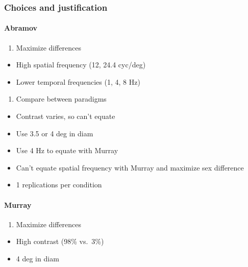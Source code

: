 \documentclass[]{article}
\providecommand{\tightlist}{%
  \setlength{\itemsep}{0pt}\setlength{\parskip}{0pt}}
\let\oldparagraph\paragraph
\renewcommand{\paragraph}[1]{\oldparagraph{#1}\mbox{}}
\begin{document}
\subsubsection{Choices and
justification}\label{choices-and-justification}

\paragraph{Abramov}\label{abramov}

\begin{enumerate}
\def\labelenumi{\arabic{enumi}.}
\tightlist
\item
  Maximize differences
\end{enumerate}

\begin{itemize}
\tightlist
\item
  High spatial frequency (12, 24.4 cyc/deg)
\item
  Lower temporal frequencies (1, 4, 8 Hz)
\end{itemize}

\begin{enumerate}
\def\labelenumi{\arabic{enumi}.}
\setcounter{enumi}{2}
\tightlist
\item
  Compare between paradigms
\end{enumerate}

\begin{itemize}
\tightlist
\item
  Contrast varies, so can't equate
\item
  Use 3.5 or 4 deg in diam
\item
  Use 4 Hz to equate with Murray
\item
  Can't equate spatial frequency with Murray and maximize sex difference
\item
  1 replications per condition
\end{itemize}

\paragraph{Murray}\label{murray}

\begin{enumerate}
\def\labelenumi{\arabic{enumi}.}
\tightlist
\item
  Maximize differences
\end{enumerate}

\begin{itemize}
\tightlist
\item
  High contrast (98\% vs.~3\%)
\item
  4 deg in diam
\end{itemize}
\end{document}
